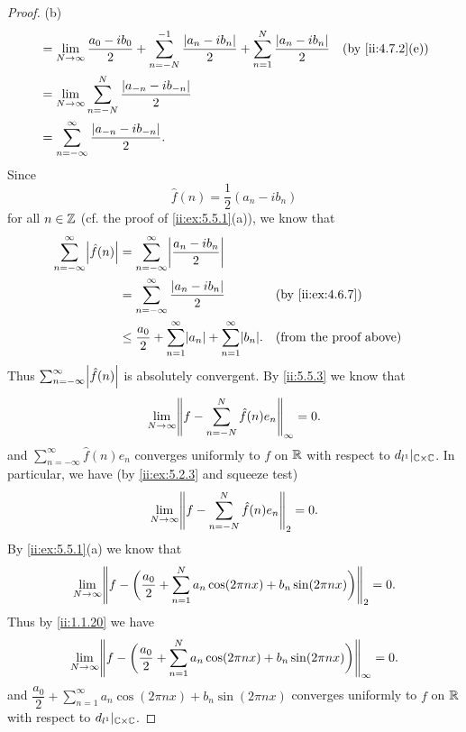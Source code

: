 \begin{proof}{(b)}
\begin{align*}
     & = \lim_{N \to \infty} \dfrac{a_0 - i b_0}{2} + \sum_{n = -N}^{-1} \dfrac{\abs{a_n - i b_n}}{2} + \sum_{n = 1}^N \dfrac{\abs{a_n - i b_n}}{2} &  & \by{ii:4.7.2}[e]       \\
     & = \lim_{N \to \infty} \sum_{n = -N}^N \dfrac{\abs{a_{-n} - i b_{-n}}}{2}                                                                                                 \\
     & = \sum_{n = -\infty}^\infty \dfrac{\abs{a_{-n} - i b_{-n}}}{2}.
  \end{align*}
  Since
  \[
    \hat{f}(n) = \dfrac{1}{2} (a_n - i b_n)
  \]
  for all \(n \in \mathbb{Z}\) (cf. the proof of \cref{ii:ex:5.5.1}(a)), we know that
  \begin{align*}
    \sum_{n = -\infty}^\infty \abs{\hat{f}(n)} & = \sum_{n = -\infty}^\infty \abs{\dfrac{a_n - i b_n}{2}}                                                                \\
                                               & = \sum_{n = -\infty}^\infty \dfrac{\abs{a_n - i b_n}}{2}                             &  & \by{ii:ex:4.6.7}              \\
                                               & \leq \dfrac{a_0}{2} + \sum_{n = 1}^\infty \abs{a_n} + \sum_{n = 1}^\infty \abs{b_n}. &  & \text{(from the proof above)}
  \end{align*}
  Thus \(\sum_{n = -\infty}^\infty \abs{\hat{f}(n)}\) is absolutely convergent.
  By \cref{ii:5.5.3} we know that
  \[
    \lim_{N \to \infty} \norm*{f - \sum_{n = -N}^N \hat{f}(n) e_n}_{\infty} = 0.
  \]
  and \(\sum_{n = -\infty}^\infty \hat{f}(n) e_n\) converges uniformly to \(f\) on \(\mathbb{R}\) with respect to \(d_{l^1}|_{\mathbb{C} \times \mathbb{C}}\).
  In particular, we have (by \cref{ii:ex:5.2.3} and squeeze test)
  \[
    \lim_{N \to \infty} \norm*{f - \sum_{n = -N}^N \hat{f}(n) e_n}_2 = 0.
  \]
  By \cref{ii:ex:5.5.1}(a) we know that
  \[
    \lim_{N \to \infty} \norm*{f - \bigg(\dfrac{a_0}{2} + \sum_{n = 1}^N a_n \cos(2 \pi n x) + b_n \sin(2 \pi n x)\bigg)}_2 = 0.
  \]
  Thus by \cref{ii:1.1.20} we have
  \[
    \lim_{N \to \infty} \norm*{f - \bigg(\dfrac{a_0}{2} + \sum_{n = 1}^N a_n \cos(2 \pi n x) + b_n \sin(2 \pi n x)\bigg)}_{\infty} = 0.
  \]
  and \(\dfrac{a_0}{2} + \sum_{n = 1}^\infty a_n \cos(2 \pi n x) + b_n \sin(2 \pi n x)\) converges uniformly to \(f\) on \(\mathbb{R}\) with respect to \(d_{l^1}|_{\mathbb{C} \times \mathbb{C}}\).
\end{proof}


